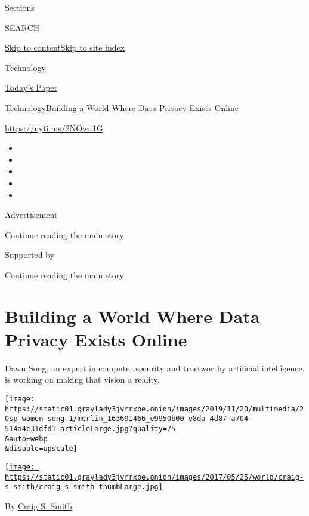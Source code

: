 Sections

SEARCH

\protect\hyperlink{site-content}{Skip to
content}\protect\hyperlink{site-index}{Skip to site index}

\href{https://www.nytimes3xbfgragh.onion/section/technology}{Technology}

\href{https://myaccount.nytimes3xbfgragh.onion/auth/login?response_type=cookie\&client_id=vi}{}

\href{https://www.nytimes3xbfgragh.onion/section/todayspaper}{Today's
Paper}

\href{/section/technology}{Technology}\textbar{}Building a World Where
Data Privacy Exists Online

\href{https://nyti.ms/2NOwa1G}{https://nyti.ms/2NOwa1G}

\begin{itemize}
\item
\item
\item
\item
\item
\end{itemize}

Advertisement

\protect\hyperlink{after-top}{Continue reading the main story}

Supported by

\protect\hyperlink{after-sponsor}{Continue reading the main story}

\hypertarget{building-a-world-where-data-privacy-exists-online}{%
\section{Building a World Where Data Privacy Exists
Online}\label{building-a-world-where-data-privacy-exists-online}}

Dawn Song, an expert in computer security and trustworthy artificial
intelligence, is working on making that vision a reality.

\texttt{[image: https://static01.graylady3jvrrxbe.onion/images/2019/11/20/multimedia/20sp-women-song-1/merlin\_163691466\_e9950b00-e8da-4d87-a704-514a4c31dfd1-articleLarge.jpg?quality=75\\\&auto=webp\\\&disable=upscale]}

\href{https://www.nytimes3xbfgragh.onion/by/craig-s-smith}{\texttt{[image: https://static01.graylady3jvrrxbe.onion/images/2017/05/25/world/craig-s-smith/craig-s-smith-thumbLarge.jpg]}}

By \href{https://www.nytimes3xbfgragh.onion/by/craig-s-smith}{Craig S.
Smith}

